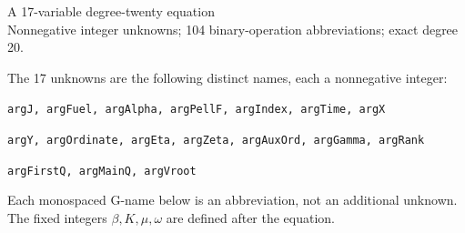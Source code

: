 \documentclass[10pt]{article}
\begin{document}
\begin{center}{\Large A 17-variable degree-twenty equation}\\
Nonnegative integer unknowns; 104 binary-operation abbreviations; exact degree 20.
\end{center}
The 17 unknowns are the following distinct names, each a nonnegative integer:
\par\small
\noindent\texttt{argJ, argFuel, argAlpha, argPellF, argIndex, argTime, argX}\par
\noindent\texttt{argY, argOrdinate, argEta, argZeta, argAuxOrd, argGamma, argRank}\par
\noindent\texttt{argFirstQ, argMainQ, argVroot}\par
\normalsize
Each monospaced G-name below is an abbreviation, not an additional unknown.
The fixed integers $\beta,K,\mu,\omega$ are defined after the equation.
\end{document}

